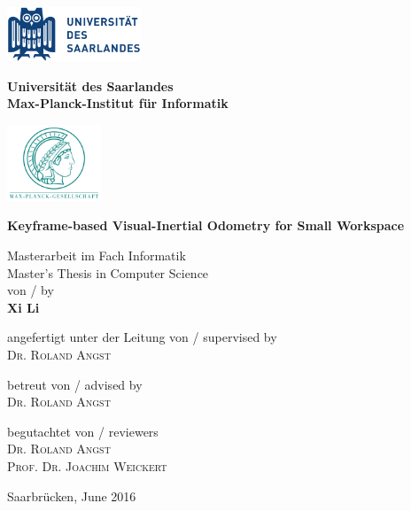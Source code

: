 \noindent
\begin{titlepage}
\includegraphics[width=4cm,natwidth=520,natheight=210]{logo_saarland.png}
\hfill
\begin{minipage}{8cm}
\centering
\vspace{-1.5cm} 
\textbf{Universit\"at des Saarlandes \\ Max-Planck-Institut f\"ur Informatik}
\end{minipage}
\hfill
\includegraphics[width=2.8cm,natwidth=300,natheight=244]{mpg.png}
\vfill

\Large
\textbf{Keyframe-based Visual-Inertial Odometry for Small Workspace}
\vfill

\large
Masterarbeit im Fach Informatik \\
Master's Thesis in Computer Science \\
von / by \\
\textbf{Xi Li} \\
\vfill

angefertigt unter der Leitung von / supervised by \\
\large{\textsc{Dr. Roland Angst}}\\
\vfill

betreut von / advised by \\
\large{\textsc{Dr. Roland Angst}} \\
\vfill

begutachtet von / reviewers \\
\large{\textsc{Dr. Roland Angst \\ Prof. Dr. Joachim Weickert}} \\
\vfill

Saarbr\"ucken, June 2016
\end{titlepage}



